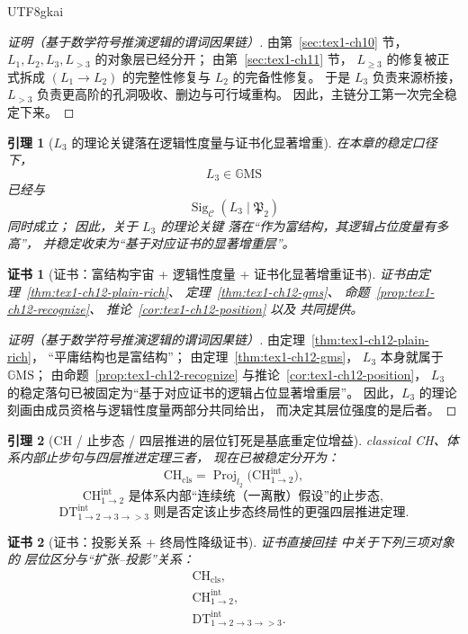 \documentclass[12pt]{article}
\newtheorem{lemma}{引理}[section]
\newtheorem{Certificate}{证书}[section]
\newcommand{\GMS}{\mathbb{G}\mathrm{MS}}
\begin{document}
\begin{CJK*}{UTF8}{gkai}
\begin{proof}[证明（基于数学符号推演逻辑的谓词因果链）]
由第~\ref{sec:tex1-ch10} 节，
\(L_1,L_2,L_3,L_{>3}\) 的对象层已经分开；
由第~\ref{sec:tex1-ch11} 节，
\(L_{\ge 3}\) 的修复被正式拆成
\((L_1\to L_2)\) 的完整性修复与
\(L_2\) 的完备性修复。
于是 \(L_3\) 负责来源桥接，
\(L_{>3}\) 负责更高阶的孔洞吸收、删边与可行域重构。
因此，主链分工第一次完全稳定下来。
\end{proof}

\begin{lemma}[\(L_3\) 的理论关键落在逻辑性度量与证书化显著增重]
\label{lem:tex1-ch6-l3}
在本章的稳定口径下，
\[
  L_3\in\GMS
\]
已经与
\[
  \operatorname{Sig}_{\mathcal C}(L_3\mid \mathfrak P_2)
\]
同时成立；
因此，关于 \(L_3\) 的理论关键
落在“作为富结构，其逻辑占位度量有多高”，
并稳定收束为“基于对应证书的显著增重层”。
\end{lemma}

\begin{Certificate}[证书：富结构宇宙 + 逻辑性度量 + 证书化显著增重证书]
\label{cert:tex1-ch6-l3}
证书由定理~\ref{thm:tex1-ch12-plain-rich}、
定理~\ref{thm:tex1-ch12-gms}、
命题~\ref{prop:tex1-ch12-recognize}、
推论~\ref{cor:tex1-ch12-position}
以及 \cite{RepoMetaGMSAxiom} 共同提供。
\end{Certificate}

\begin{proof}[证明（基于数学符号推演逻辑的谓词因果链）]
由定理~\ref{thm:tex1-ch12-plain-rich}，
“平庸结构也是富结构”；
由定理~\ref{thm:tex1-ch12-gms}，
\(L_3\) 本身就属于 \(\GMS\)；
由命题~\ref{prop:tex1-ch12-recognize} 与推论~\ref{cor:tex1-ch12-position}，
\(L_3\) 的稳定落句已被固定为“基于对应证书的逻辑占位显著增重层”。
因此，\(L_3\) 的理论刻画由成员资格与逻辑性度量两部分共同给出，
而决定其层位强度的是后者。
\end{proof}

\begin{lemma}[CH / 止步态 / 四层推进的层位钉死是基底重定位增益]
\label{lem:tex1-ch6-ch}
classical CH、体系内部止步句与四层推进定理三者，
现在已被稳定分开为：
\[
  \mathrm{CH}_{\mathrm{cls}}
  =
  \operatorname{Proj}_{l_2}\bigl(\mathrm{CH}^{\mathrm{int}}_{1\to 2}\bigr),
\]
\[
  \mathrm{CH}^{\mathrm{int}}_{1\to 2}
  \text{ 是体系内部“连续统（一离散）假设”的止步态},
\]
\[
  \mathrm{DT}^{\mathrm{int}}_{1\to 2\to 3\to >3}
  \text{ 则是否定该止步态终局性的更强四层推进定理}.
\]
\end{lemma}

\begin{Certificate}[证书：投影关系 + 终局性降级证书]
\label{cert:tex1-ch6-ch}
证书直接回挂 \cite{RepoTex41HomotopyRepairBundle} 中关于下列三项对象的
层位区分与“扩张--投影”关系：
\[
  \begin{aligned}
    &\mathrm{CH}_{\mathrm{cls}},\\
    &\mathrm{CH}^{\mathrm{int}}_{1\to 2},\\
    &\mathrm{DT}^{\mathrm{int}}_{1\to 2\to 3\to >3}.
  \end{aligned}
\]
\end{Certificate}


\end{CJK*}
\end{document}
